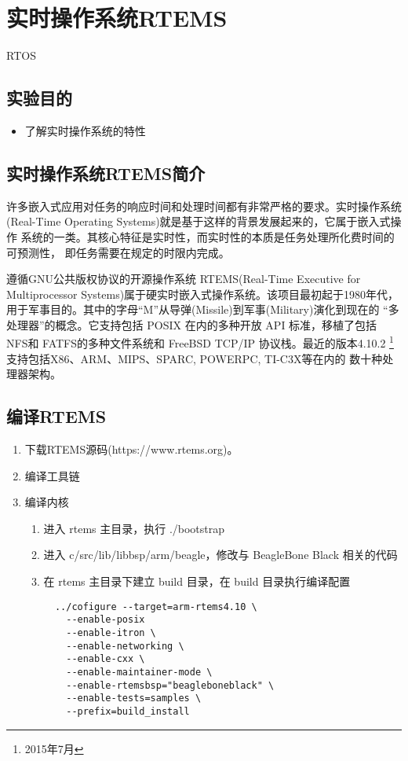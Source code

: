 \chapter{实时操作系统RTEMS}{RTOS}

\section{实验目的}
\begin{itemize}\itemsep=-3pt
  \item 了解实时操作系统的特性
\end{itemize}

\section{实时操作系统RTEMS简介}
	许多嵌入式应用对任务的响应时间和处理时间都有非常严格的要求。实时操作系统
(Real-Time Operating Systems)就是基于这样的背景发展起来的，它属于嵌入式操作
系统的一类。其核心特征是实时性，而实时性的本质是任务处理所化费时间的可预测性，
即任务需要在规定的时限内完成。

	遵循GNU公共版权协议的开源操作系统 RTEMS(Real-Time Executive for
Multiprocessor Systems)属于硬实时嵌入式操作系统。该项目最初起于1980年代，
用于军事目的。其中的字母``M''从导弹(Missile)到军事(Military)演化到现在的
``多处理器''的概念。它支持包括 POSIX 在内的多种开放 API 标准，移植了包括
NFS和 FATFS的多种文件系统和 FreeBSD TCP/IP 协议栈。最近的版本4.10.2
\footnote{2015年7月} 支持包括X86、ARM、MIPS、SPARC, POWERPC, TI-C3X等在内的
数十种处理器架构。

\section{编译RTEMS}
\begin{enumerate}
  \item 下载RTEMS源码(https://www.rtems.org)。
  \item 编译工具链
  \item 编译内核
  \begin{enumerate}
    \item 进入 rtems 主目录，执行 ./bootstrap
	\item 进入 c/src/lib/libbsp/arm/beagle，修改与 BeagleBone Black 相关的代码
	\item 在 rtems 主目录下建立 build 目录，在 build 目录执行编译配置
\begin{verbatim}
  ../cofigure --target=arm-rtems4.10 \
    --enable-posix
    --enable-itron \
    --enable-networking \
    --enable-cxx \
    --enable-maintainer-mode \
    --enable-rtemsbsp="beagleboneblack" \
    --enable-tests=samples \
    --prefix=build_install
\end{verbatim}
  \end{enumerate}
\end{enumerate}

